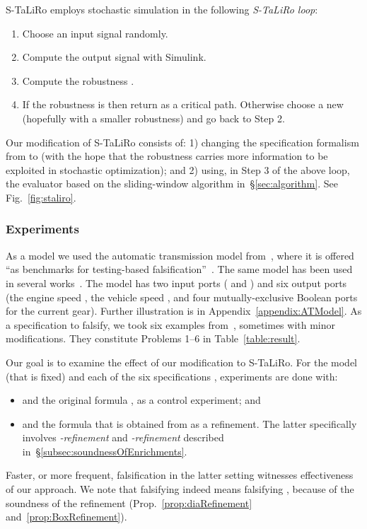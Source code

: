 \documentclass[envcountsect,orivec]{llncs} \usepackage{etex} \usepackage[]{graphicx}
\begin{document}
S-TaLiRo employs stochastic simulation in the following 
\emph{S-TaLiRo loop}: 
\begin{enumerate}
 \item Choose an input signal   randomly.
 \item Compute the output signal
        with Simulink.
 \item Compute the robustness
  .
 \item If the robustness is  then return 
  as a critical path. Otherwise choose a new  
  (hopefully with a smaller robustness)
    and go back to Step 2.
\end{enumerate}
Our  modification of S-TaLiRo consists of: 1) changing the specification formalism from
 to  (with the hope that the robustness
 carries more
information to be exploited in stochastic optimization); and 2) using, in
 Step 3 of the above loop, the 
evaluator based on the sliding-window algorithm
in~\S{}\ref{sec:algorithm}. 
See  Fig.~\ref{fig:staliro}.














\subsubsection{Experiments}
As a model  we used the automatic transmission model
from~\cite{HoxhaAF14arch1}, where it is offered ``as benchmarks
        for testing-based falsification''~\cite{HoxhaAF14arch1}.
The same model has been used 
in several works~\cite{DBLP:conf/pts/YangHF12, 6315384, DBLP:conf/hybrid/JinDDS13}.
The model has two input ports (\emph{} and
\emph{}) and six output ports (the engine speed , 
the vehicle speed , and four mutually-exclusive Boolean ports
  for the current gear).
Further illustration  is in Appendix~\ref{appendix:ATModel}.
As a specification  to  falsify, we took six examples from~\cite{HoxhaAF14arch1},
sometimes with minor modifications. They constitute Problems 1--6 in Table~\ref{table:result}.

Our goal is to examine the effect of our modification to S-TaLiRo.
For the  model  (that is fixed) and each of the six specifications
, experiments are done with:
\begin{itemize}
 \item  and the original  formula , as a
       control experiment;
       and
 \item  and the  formula  that is
       obtained from  as a
       refinement. The latter specifically involves \emph{-refinement} and
       \emph{-refinement} described in~\S{}\ref{subsec:soundnessOfEnrichments}.
\end{itemize}
Faster, or more frequent, falsification in the latter setting witnesses
effectiveness of our  approach. We note that
falsifying  indeed means falsifying , because of the
soundness of the refinement (Prop.~\ref{prop:diaRefinement} and~\ref{prop:BoxRefinement}).
\end{document}
